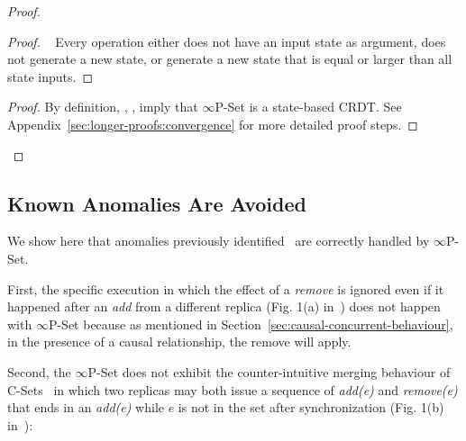 \documentclass[11pt, oneside]{article}   	%
\begin{document}
\begin{proof}
	
	\begin{proof}
		\pfsketch~ Every operation either does not have an input state as argument, does not generate a new state, or generate a new state that is equal or larger than all state inputs.
	\end{proof}

	\qedstep
	\begin{proof}
		\pf By definition, , ,  imply that $\infty$P-Set is a state-based CRDT. See Appendix~\ref{sec:longer-proofs:convergence} for more detailed proof steps.
	\end{proof}
\end{proof}


\subsection{Known Anomalies Are Avoided}

We show here that anomalies previously identified~\cite{bieniusa:hal-00769554} are correctly handled by $\infty$P-Set. 

First, the specific execution in which the effect of a \textit{remove} is ignored even if it happened after an \textit{add} from a different replica (Fig. 1(a) in~\cite{bieniusa:hal-00769554}) does not happen with $\infty$P-Set because as mentioned in Section~\ref{sec:causal-concurrent-behaviour}, in the presence of a causal relationship, the remove will apply.

Second,  the $\infty$P-Set does not exhibit the counter-intuitive merging behaviour of C-Sets~\cite{bieniusa:hal-00769554} in which two replicas may both issue a sequence of \textit{add(e)} and \textit{remove(e)} that ends in an \textit{add(e)} while $e$ is not in the set after synchronization (Fig. 1(b) in~\cite{bieniusa:hal-00769554}):
\end{document}
